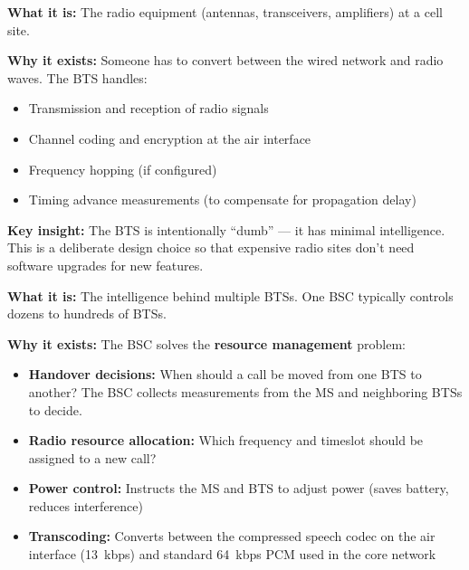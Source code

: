 
\textbf{What it is:} The radio equipment (antennas, transceivers, amplifiers) at a cell site.

\textbf{Why it exists:} Someone has to convert between the wired network and radio waves. The BTS handles:

\begin{itemize}
\tightlist
\item
  Transmission and reception of radio signals
\item
  Channel coding and encryption at the air interface
\item
  Frequency hopping (if configured)
\item
  Timing advance measurements (to compensate for propagation delay)
\end{itemize}

\begin{CNinsight}

\textbf{Key insight:} The BTS is intentionally ``dumb'' — it has minimal intelligence. This is a deliberate design choice so that expensive radio sites don’t need software upgrades for new features.

\end{CNinsight}


\textbf{What it is:} The intelligence behind multiple BTSs. One BSC typically controls dozens to hundreds of BTSs.

\textbf{Why it exists:} The BSC solves the \textbf{resource management} problem:

\begin{itemize}
\tightlist
\item
  \textbf{Handover decisions:} When should a call be moved from one BTS to another? The BSC collects measurements from the MS and neighboring BTSs to decide.
\item
  \textbf{Radio resource allocation:} Which frequency and timeslot should be assigned to a new call?
\item
  \textbf{Power control:} Instructs the MS and BTS to adjust power (saves battery, reduces interference)
\item
  \textbf{Transcoding:} Converts between the compressed speech codec on the air interface (13~kbps) and standard 64~kbps PCM used in the core network
\end{itemize}


